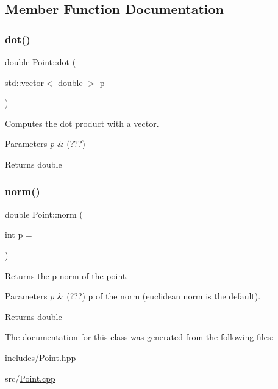 \subsection{Member Function Documentation}
\mbox{\label{class_point_a9d8da6733d7e4110a62e8d0f82676761}} 
\subsubsection{\texorpdfstring{dot()}{dot()}}
{\footnotesize\ttfamily double Point\+::dot (\begin{DoxyParamCaption}\item[{std\+::vector$<$ double $>$}]{p }\end{DoxyParamCaption})}



Computes the dot product with a vector. 


\begin{DoxyParams}{Parameters}
{\em p} & (???) \\
\hline
\end{DoxyParams}
\begin{DoxyReturn}{Returns}
double 
\end{DoxyReturn}
\mbox{\label{class_point_aab64e3f0a9eecba00a1607eb4c7768c3}} 
\subsubsection{\texorpdfstring{norm()}{norm()}}
{\footnotesize\ttfamily double Point\+::norm (\begin{DoxyParamCaption}\item[{int}]{p = {} }\end{DoxyParamCaption})}



Returns the p-\/norm of the point. 


\begin{DoxyParams}{Parameters}
{\em p} & (???) p of the norm (euclidean norm is the default). \\
\hline
\end{DoxyParams}
\begin{DoxyReturn}{Returns}
double 
\end{DoxyReturn}


The documentation for this class was generated from the following files\+:\begin{DoxyCompactItemize}
\item 
includes/Point.\+hpp\item 
src/\hyperlink{_point_8cpp}{Point.\+cpp}\end{DoxyCompactItemize}

